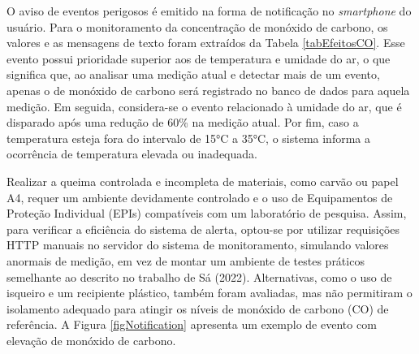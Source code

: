 O aviso de eventos perigosos é emitido na forma de notificação no \textit{smartphone} do usuário. Para o monitoramento da concentração de monóxido de carbono, os valores e as mensagens de 
texto foram extraídos da Tabela \ref{tabEfeitosCO}. Esse evento possui prioridade superior aos de temperatura e umidade do ar, o que significa que, ao analisar uma medição atual e detectar 
mais de um evento, apenas o de monóxido de carbono será registrado no banco de dados para aquela medição. Em seguida, considera-se o evento relacionado à umidade do ar, que é disparado após 
uma redução de 60\% na medição atual. Por fim, caso a temperatura esteja fora do intervalo de 15°C a 35°C, o sistema informa a ocorrência de temperatura elevada ou inadequada.

Realizar a queima controlada e incompleta de materiais, como carvão ou papel A4, requer um ambiente devidamente controlado e o uso de Equipamentos de Proteção Individual (EPIs) compatíveis com 
um laboratório de pesquisa. Assim, para verificar a eficiência do sistema de alerta, optou-se por utilizar requisições HTTP manuais no servidor do sistema de 
monitoramento, simulando valores anormais de medição, em vez de montar um ambiente de testes práticos semelhante ao descrito no trabalho de Sá (2022). Alternativas, como o uso de isqueiro e um 
recipiente plástico, também foram avaliadas, mas não permitiram o isolamento adequado para atingir os níveis de monóxido de carbono (CO) de referência. A Figura \ref{figNotification} apresenta um 
exemplo de evento com elevação de monóxido de carbono.

